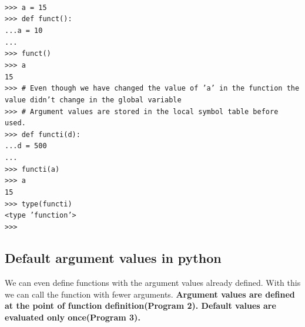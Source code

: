 \documentclass[12pt,a4paper]{article}
\begin{document}
\texttt{\\
>>> a = 15\\
>>> def funct():\\
...\hspace{30pt}a = 10\\
...\\
>>> funct()\\
>>> a\\
15\\
>>> \# Even though we have changed the value of 'a' in the function the value didn't change in the global variable\\
>>> \# Argument values are stored in the local symbol table before used.\\
>>> def functi(d):\\
...\hspace{30pt}d = 500\\
...\\
>>> functi(a)\\
>>> a\\
15\\
>>> type(functi)\\
<type 'function'>\\
>>>
}


\subsection{Default argument values in python}
We can even define functions with the argument values already defined. With this we can call the function with fewer arguments. \textbf{Argument values are defined at the point of function definition(Program 2). Default values are evaluated only once(Program 3).}
\end{document}
